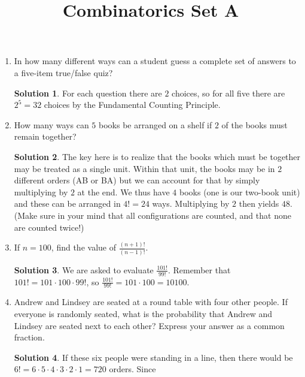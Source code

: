 \documentclass{article}
\title{Combinatorics Set A}
\author{}
\date{}
\theoremstyle{definition}
\newtheorem*{solution}{Solution}
\begin{document}
\maketitle

\begin{multicols}{2}
    \begin{enumerate}
        \item In how many different ways can a student guess a complete set of 
            answers to a five-item true/false quiz?
            \begin{solution}
                For each question there are $2$ choices, so for all five there are 
                $2^5 = 32$ choices by the Fundamental Counting Principle.
            \end{solution}
        \item How many ways can $5$ books be arranged on a shelf if $2$ of the books 
            must remain together?
            \begin{solution}
                The key here is to realize that the books which must be together may 
                be treated as a single unit. Within that unit, the books may be in 
                $2$ different orders (AB or BA) but we can account for that by 
                simply multiplying by $2$ at the end. We thus have $4$ books (one is 
                our two-book unit) and these can be arranged in $4! = 24$ ways.  
                Multiplying by $2$ then yields $48$. (Make sure in your mind that 
                all configurations are counted, and that none are counted twice!)
            \end{solution}
        \item If $n = 100$, find the value of $\frac{(n+1)!}{(n-1)!}$.
            \begin{solution}
                We are asked to evaluate $\frac{101!}{99!}$. Remember that $101! = 
                101 \cdot 100 \cdot 99!$, so $\frac{101!}{99!} = 101 \cdot 100 = 
                10100$.
            \end{solution}
        \item Andrew and Lindsey are seated at a round table with four other people.  
            If everyone is randomly seated, what is the probability that Andrew and 
            Lindsey are seated next to each other? Express your answer as a common 
            fraction.
            \begin{solution}
                If these six people were standing in a line, then there would be $6!  
                = 6 \cdot 5 \cdot 4 \cdot 3 \cdot 2 \cdot 1 = 720$ orders. Since 

\end{solution}
\end{enumerate}
\end{multicols}
\end{document}
